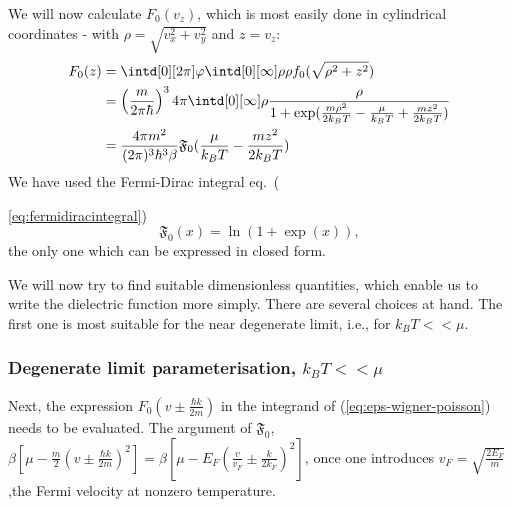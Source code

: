\documentclass[physics,phd,nolot,nolof]{uccthesis}%
\begin{document}
We will now calculate $F_0(v_z)$, which is most easily done in cylindrical coordinates - with  $\rho=\sqrt{v_x^2+v_y^2}$ and $z=v_z$:
\begin{equation}
  \begin{split}
    F_0(z)
    &=\intd[0][2\pi]\varphi\intd[0][\infty]\rho \rho f_0(\sqrt{\rho^2 +z^2})\\
    & =\left(\frac{m}{2\pi\hbar}\right)^3 
    4\pi \intd[0][\infty]\rho  
\frac{\rho}{1+\text{exp}(\frac{m\rho^2}{2k_BT}-\frac{\mu}{k_BT}+\frac{m z^2}{2k_BT})}\\
&=\frac{4\pi m^2}{(2\pi)^3 \hbar^3\beta}\mathfrak{F}_0(\frac{\mu}{k_BT}-\frac{m z^2}{2k_BT})
  \end{split}
  \label{eq:cyclindricalcoordinatesF}
\end{equation}
We have used the Fermi-Dirac integral eq.~({\ref{eq:fermidiracintegral})
\begin{equation}
  \mathfrak{F}_0(x)=\ln (1+\exp(x)),
  \label{eq:fermi-dirac-int_0}
\end{equation}
the only one which can be expressed in closed form.

We will now try to find suitable dimensionless quantities, which enable us to write the dielectric function more simply.
There are several choices at hand. The first one is most suitable for the near degenerate limit, i.e., for $k_B T<< \mu$. 
\subsubsection{Degenerate limit parameterisation, $k_B T<< \mu$}

Next, the expression $F_0(v \pm \frac{\hbar k}{2 m})$ in the integrand of (\ref{eq:eps-wigner-poisson}) needs to be evaluated. 
The argument of $\mathfrak{F}_0$, $\beta \left[ \mu -\frac{m}{2}\left(v \pm \frac{\hbar k}{2m}\right)^2\right]
=\beta \left[ \mu - E_F\left(\frac{v}{v_F}\pm\frac{k}{2k_F}\right)^2\right]$,
once one introduces $v_F=\sqrt{\frac{2E_F}{m}}$,the Fermi velocity at nonzero temperature.

}
\end{document}
